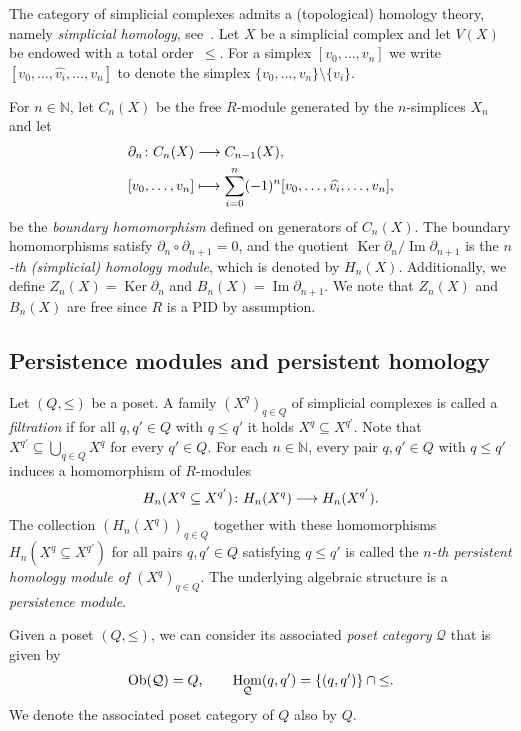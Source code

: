 \documentclass[oneside]{amsart}
\theoremstyle{definition}
\DeclareMathOperator\Ker{Ker}
\DeclareMathOperator\Ob{Ob}
\DeclareMathOperator\Hom{Hom}
\begin{document}
The category of simplicial complexes admits a (topological) homology theory, namely \emph{simplicial homology}, see~\cite{Hatcher2015, Spanier1982}.
Let $X$ be a simplicial complex and let $V(X)$ be endowed with a total order~$\leq$.
For a simplex $[v_0, \dotsc, v_n]$ we write $[v_0, \dotsc, \widehat{v_i}, \dotsc, v_n]$ to denote the simplex $\{ v_0, \dotsc, v_n \} \setminus \{ v_i \}$.

For $n \in \mathbb N$, let $C_n(X)$ be the free $R$-module generated by the $n$-simplices $X_n$ and let
\begin{align*}
    \partial_n\colon C_n(X) &\longrightarrow C_{n-1}(X) \text, \\
    [v_0, \dotsc, v_n] &\longmapsto \sum_{i = 0}^n (-1)^n [v_0, \dotsc, \widehat{v_i}, \dotsc, v_n] \text,
\end{align*}
be the \emph{boundary homomorphism} defined on generators of $C_n(X)$.
The boundary homomorphisms satisfy $\partial_n \circ \partial_{n+1} = 0$, and the quotient $\Ker \partial_n/\operatorname{Im} \partial_{n+1}$ is the \emph{$n$-th (simplicial) homology module}, which is denoted by $H_n(X)$.
Additionally, we define $Z_n(X) = \Ker \partial_n$ and $B_n(X) = \operatorname{Im} \partial_{n+1}$.
We note that $Z_n(X)$ and $B_n(X)$ are free since $R$ is a PID by assumption.

\subsection{Persistence modules and persistent homology}

Let $(Q, \mathord\leq)$ be a poset.
A family $(X^q)_{q \in Q}$ of simplicial complexes is called a \emph{filtration} if for all $q, q' \in Q$ with $q \leq q'$ it holds $X^q \subseteq X^{q'}$.
Note that $X^{q'} \subseteq \bigcup_{q \in Q} X^q$ for every $q' \in Q$.
For each $n \in \mathbb N$, every pair $q, q' \in Q$ with $q \leq q'$ induces a homomorphism of $R$-modules
\[ H_n(X^q \subseteq X^{q'})\colon H_n(X^q) \longrightarrow H_n(X^{q'}) \text. \]
The collection $(H_n(X^q))_{q \in Q}$ together with these homomorphisms $H_n(X^q \subseteq X^{q'})$ for all pairs $q, q' \in Q$ satisfying $q \leq q'$ is called the \emph{$n$-th persistent homology module of $(X^q)_{q \in Q}$}.
The underlying algebraic structure is a \emph{persistence module}.

Given a poset $(Q, \mathord\leq)$, we can consider its associated \emph{poset category} $\mathcal Q$ that is given by
\[ \Ob(\mathcal Q) = Q \text, \qquad \Hom_{\mathcal Q}(q, q') = \{ (q, q') \} \cap \mathord\leq \text. \]
We denote the associated poset category of $Q$ also by $Q$.
\end{document}
